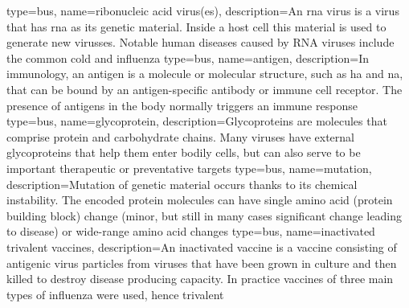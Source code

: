 {
    type=bus,
    name=ribonucleic acid virus(es),
    description={An \acrshort{rna} virus is a virus that has \acrshort{rna} as
    its genetic material. Inside a host cell this material is used to generate
    new virusses. Notable human diseases caused by RNA viruses include the
    common cold and influenza}
}
{
    type=bus,
    name=antigen,
    description={In immunology, an antigen is a molecule or molecular
    structure, such as \acrshort{ha} and \acrshort{na}, that can be bound by an
    antigen-specific antibody or immune cell receptor.  The presence of
    antigens in the body normally triggers an immune response
    }
}
{
    type=bus,
    name=glycoprotein,
    description={Glycoproteins are molecules that comprise protein and
    carbohydrate chains. Many viruses have external glycoproteins that
    help them enter bodily cells, but can also serve to be important
    therapeutic or preventative targets}
}
{
    type=bus,
    name=mutation,
    description={Mutation of genetic material occurs thanks to its chemical
    instability. The encoded protein molecules can have single amino acid
    (protein building block) change (minor, but still in many cases significant
    change leading to disease) or wide-range amino acid changes}
}
{
    type=bus,
    name=inactivated trivalent vaccines,
    description={An inactivated vaccine is a vaccine consisting of
    \gls{antigen}ic virus particles from viruses that have been grown in
    culture and then killed to destroy disease producing capacity. In practice
    vaccines of three main types of influenza were used, hence trivalent}
}
